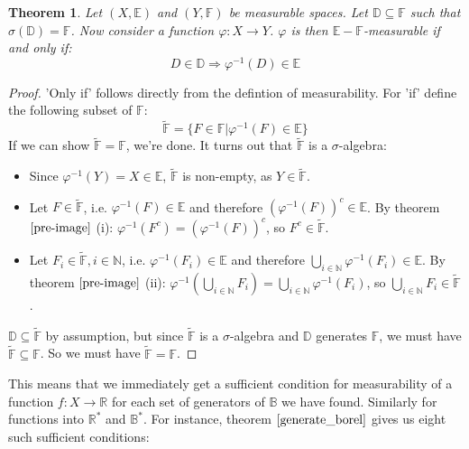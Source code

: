 \documentclass[12pt, a4paper]{article}
\newtheorem{theorem}{Theorem}[section]
\numberwithin{equation}{section}
\begin{document}
\begin{theorem}
\label{measureability_criterion}
Let $(X,\mathbb{E})$ and $(Y,\mathbb{F})$ be measurable spaces. Let $\mathbb{D}\subseteq\mathbb{F}$ such that $\sigma(\mathbb{D})=\mathbb{F}$. Now consider a function $\varphi: X\rightarrow Y$. $\varphi$ is then $\mathbb{E}-\mathbb{F}$-measurable if and only if:
\begin{equation}
\label{D_criterion}
D\in\mathbb{D}\Rightarrow \varphi^{-1}(D)\in\mathbb{E}
\end{equation}
\end{theorem}
\begin{proof}
'Only if' follows directly from the defintion of measurability. For 'if' define the following subset of $\mathbb{F}$:
\begin{equation}
\tilde{\mathbb{F}}=\{F\in\mathbb{F}|\varphi^{-1}(F)\in\mathbb{E}\}
\end{equation}
If we can show $\tilde{\mathbb{F}}=\mathbb{F}$, we're done. It turns out that $\tilde{\mathbb{F}}$ is a $\sigma$-algebra:
\begin{itemize}
\item Since $\varphi^{-1}(Y)=X\in\mathbb{E}$, $\tilde{\mathbb{F}}$ is non-empty, as $Y\in\tilde{\mathbb{F}}$.
\item Let $F\in\tilde{\mathbb{F}}$, i.e. $\varphi^{-1}(F)\in\mathbb{E}$ and therefore $(\varphi^{-1}(F))^c\in\mathbb{E}$. By theorem $\ref{pre-image}$ (i): $\varphi^{-1}(F^c)=(\varphi^{-1}(F))^c$, so $F^c\in\tilde{\mathbb{F}}$.
\item Let $F_i\in\tilde{\mathbb{F}},i\in\mathbb{N}$, i.e. $\varphi^{-1}(F_i)\in\mathbb{E}$ and therefore $\bigcup_{i\in\mathbb{N}}\varphi^{-1}(F_i)\in\mathbb{E}$. By theorem $\ref{pre-image}$ (ii): $\varphi^{-1}\left(\bigcup_{i\in\mathbb{N}}F_i\right)=\bigcup_{i\in\mathbb{N}}\varphi^{-1}(F_i)$, so $\bigcup_{i\in\mathbb{N}}F_i\in\tilde{\mathbb{F}}$.
\end{itemize}
$\mathbb{D}\subseteq\tilde{\mathbb{F}}$ by assumption, but since $\tilde{\mathbb{F}}$ is a $\sigma$-algebra and $\mathbb{D}$ generates $\mathbb{F}$, we must have $\tilde{\mathbb{F}}\subseteq\mathbb{F}$. So we must have $\tilde{\mathbb{F}}=\mathbb{F}$.
\end{proof}

This means that we immediately get a sufficient condition for measurability of a function $f: X\rightarrow\mathbb{R}$ for each set of generators of $\mathbb{B}$ we have found. Similarly for functions into $\mathbb{R}^*$ and $\mathbb{B}^*$. For instance, theorem $\ref{generate_borel}$ gives us eight such sufficient conditions:
\end{document}

